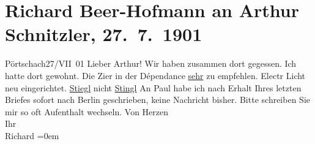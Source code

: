 

         
         \renewcommand{\erwaehntePersonen}{Personen: Paul Goldmann}
         \renewcommand{\erwaehnteOrte}{Orte: Berlin, Hotel Stiegl, Pörtschach, Vahrn}
         \renewcommand{\erwaehnteWerke}{}
               \section[Richard Beer-Hofmann an Arthur Schnitzler, 27. 7. 1901]{ Richard Beer-Hofmann an Arthur Schnitzler, 27. 7. 1901}\nopagebreak{}\rehead{ }\begin{ledgroupsized}[t]{13cm}\normalsize\beginnumbering \toendnotes[C]{\smallbreak\pagebreak[2]} 
\toendnotes[C]{\smallbreak}\pstart
           \raggedleft{}{\pb}Pörtschach27/VII 01\pend
           \pstart
           Lieber Arthur! Wir haben zusammen dort gegessen. Ich hatte dort gewohnt. Die Zi{\geminationm}er in der Dépendance \uline{sehr} zu empfehlen. Electr Licht neu eingerichtet.\pend
           \pstart
           \uline{Stiegl} nicht \uline{Stingl}\pend
           \pstart
           An Paul habe ich nach Erhalt Ihres letzten
               Briefes sofort nach Berlin geschrieben, {\pb}keine Nachricht bisher.\pend
           \pstart
           Bitte schreiben Sie mir so oft \label{T_L01153-1v}\label{T_L01153-1h} Aufenthalt
               wechseln.\pend
           \pstart
           Von Herzen{\\[\baselineskip]}Ihr{\\[\baselineskip]}\spacefill\mbox{Richard}\pend
           \leftskip=0em{}
         
         \endnumbering{}\end{ledgroupsized}  \newcommand{\dateiname}{L01153}\newcommand{\titel}{Richard Beer-Hofmann an Arthur Schnitzler, 27. 7. 1901}\newcommand{\editorInnen}{Martin Anton Müller und Gerd-Hermann Susen}
      